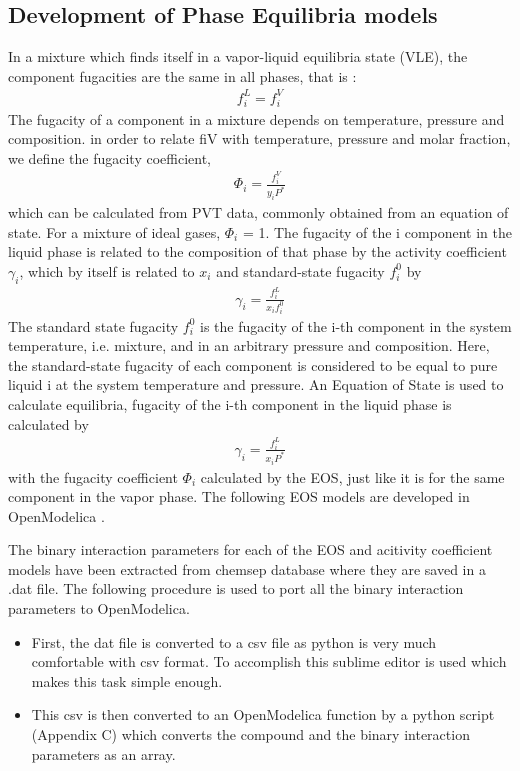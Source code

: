 \documentclass[12pt]{report}
\begin{document}
\subsection{Development of Phase Equilibria models}
In a mixture which finds itself in a vapor-liquid equilibria state (VLE), the component fugacities are the same in all phases, that is :
\begin{align*}
f_i^L = f_i^V 
\end{align*}
The fugacity of a component in a mixture depends on temperature, pressure and composition. in order to relate fiV with temperature, pressure and molar fraction, we define the fugacity coefficient,
\begin{align*}
\Phi_i = \frac{f_i^V}{y_iP^*}
\end{align*}
which can be calculated from PVT data, commonly obtained from an equation of state. For a mixture of ideal gases, $\Phi_i$ = 1.
The fugacity of the i component in the liquid phase is related to the composition of that phase by the activity coefficient $\gamma_i$, which by itself is related to $x_i$ and standard-state fugacity $f_i^0$ by
\begin{align*}
\gamma_i = \frac{f_i^L}{x_if_i^0}
\end{align*}
The standard state fugacity $f_i^0$ is the fugacity of the i-th component in the system temperature, i.e. mixture, and in an arbitrary pressure and composition. Here, the standard-state fugacity of each component is considered to be equal to pure liquid i at the system temperature and pressure. An Equation of State is used to calculate equilibria, fugacity of the i-th component in the liquid phase is calculated by
\begin{align*}
\gamma_i = \frac{f_i^L}{x_iP^*}
\end{align*}
with the fugacity coefficient $\Phi_i$ calculated by the EOS, just like it is for the same component in the vapor phase.
The following EOS models are developed in OpenModelica \cite{DWSIM}.

The binary interaction parameters for each of the EOS and acitivity coefficient models have been extracted from chemsep database where they are saved in a .dat file. The following procedure is used to port all the binary interaction parameters to OpenModelica. 

\begin{itemize}
\item First, the dat file is converted to a csv file as python is very much comfortable with csv format. To accomplish this sublime editor is used which makes this task simple enough.
\item This csv is then converted to an OpenModelica function by a python script (Appendix C) which converts the compound and the binary interaction parameters as an array.
\end{itemize}
\end{document}
